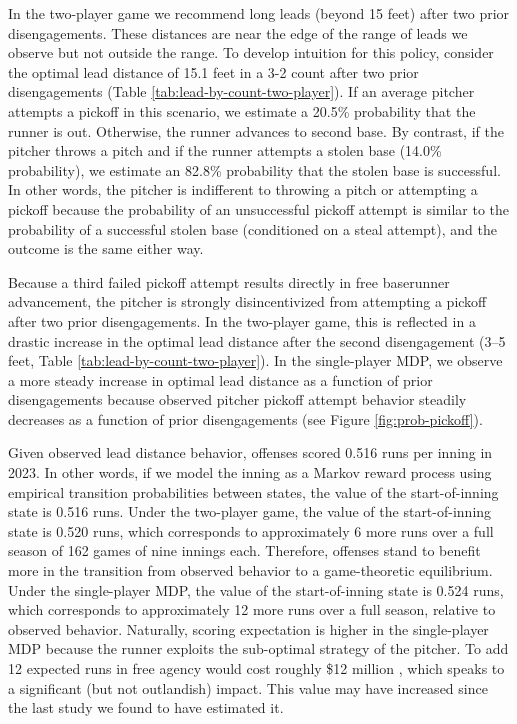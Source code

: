 \documentclass[opre,dblanonrev]{informs4}
\begin{document}
    In the two-player game we recommend long leads (beyond 15 feet) after two prior disengagements. These distances are near the edge of the range of leads we observe but not outside the range. To develop intuition for this policy, consider the optimal lead distance of 15.1 feet in a 3-2 count after two prior disengagements (Table \ref{tab:lead-by-count-two-player}). If an average pitcher attempts a pickoff in this scenario, we estimate a 20.5\% probability that the runner is out. Otherwise, the runner advances to second base. By contrast, if the pitcher throws a pitch and if the runner attempts a stolen base (14.0\% probability), we estimate an 82.8\% probability that the stolen base is successful. In other words, the pitcher is indifferent to throwing a pitch or attempting a pickoff because the probability of an unsuccessful pickoff attempt is similar to the probability of a successful stolen base (conditioned on a steal attempt), and the outcome is the same either way.

    Because a third failed pickoff attempt results directly in free baserunner advancement, the pitcher is strongly disincentivized from attempting a pickoff after two prior disengagements. In the two-player game, this is reflected in a drastic increase in the optimal lead distance after the second disengagement (3--5 feet, Table \ref{tab:lead-by-count-two-player}). In the single-player MDP, we observe a more steady increase in optimal lead distance as a function of prior disengagements because observed pitcher pickoff attempt behavior steadily decreases as a function of prior disengagements (see Figure \ref{fig:prob-pickoff}).

    Given observed lead distance behavior, offenses scored 0.516 runs per inning in 2023. In other words, if we model the inning as a Markov reward process using empirical transition probabilities between states, the value of the start-of-inning state is 0.516 runs. Under the two-player game, the value of the start-of-inning state is 0.520 runs, which corresponds to approximately 6 more runs over a full season of 162 games of nine innings each. Therefore, offenses stand to benefit more in the transition from observed behavior to a game-theoretic equilibrium. Under the single-player MDP, the value of the start-of-inning state is 0.524 runs, which corresponds to approximately 12 more runs over a full season, relative to observed behavior. Naturally, scoring expectation is higher in the single-player MDP because the runner exploits the sub-optimal strategy of the pitcher. To add 12 expected runs in free agency would cost roughly \$12 million \citep{clemens_what_2021}, which speaks to a significant (but not outlandish) impact. This value may have increased since the last study we found to have estimated it.
\end{document}

